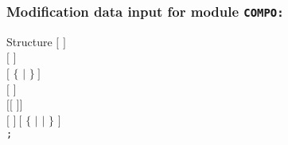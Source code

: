 \clearpage

\subsubsection{Modification data input for module {\tt COMPO:}}\label{sect:desccpo2}

\vskip -0.5cm

\begin{DataStructure}{Structure }
$[$   $]$ \\
$[$  $]$ \\
$[$   $\{$  $|$ \moc{*} $\}~]$ \\
$[$   $]$ \\
$[[$   $]]$ \\
$[$  $]~[$   $\{$  $|$  $|$  $\}$ $]$ \\
{\tt ;}
\end{DataStructure}

